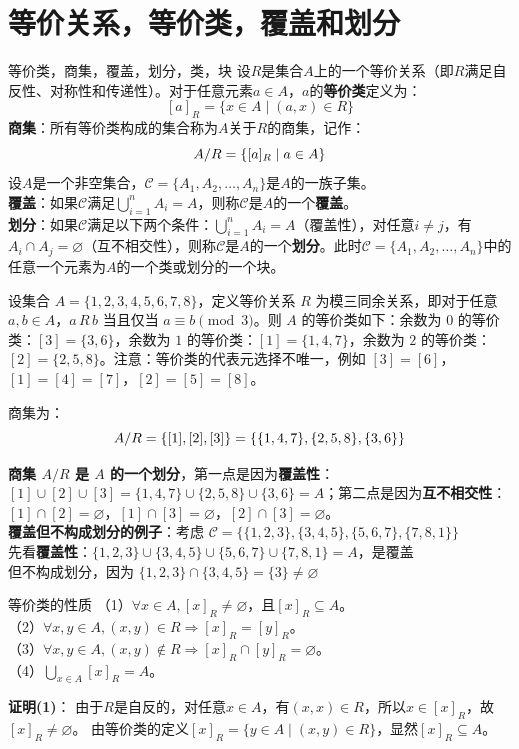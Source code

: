 \documentclass[lang=cn,11pt]{elegantbook}
\begin{document}
\section{等价关系，等价类，覆盖和划分}
\begin{definition}{等价类，商集，覆盖，划分，类，块}
设$R$是集合$A$上的一个等价关系（即$R$满足自反性、对称性和传递性）。对于任意元素$a \in A$，$a$的\textbf{等价类}定义为：\vspace{-10pt}
\[
[a]_R = \{x \in A \mid (a,x) \in R\}
\]
\textbf{商集}：所有等价类构成的集合称为$A$关于$R$的商集，记作：\vspace{-5pt}
\[
A/R = \{[a]_R \mid a \in A\}\vspace{-5pt}
\]
设$A$是一个非空集合，$\mathcal{C} = \{A_1, A_2, \ldots, A_n\}$是$A$的一族子集。\\
\textbf{覆盖}：如果$\mathcal{C}$满足$\bigcup_{i=1}^{n} A_i = A$，则称$\mathcal{C}$是$A$的一个\textbf{覆盖}。\\
\textbf{划分}：如果$\mathcal{C}$满足以下两个条件：$\bigcup_{i=1}^{n} A_i = A$（覆盖性），对任意$i \neq j$，有$A_i \cap A_j = \varnothing$（互不相交性），则称$\mathcal{C}$是$A$的一个\textbf{划分}。此时$\mathcal{C} = \{A_1, A_2, \ldots, A_n\}$中的任意一个元素为$A$的一个类或划分的一个块。
\end{definition}
设集合 $A = \{1, 2, 3, 4, 5, 6, 7, 8\}$，定义等价关系 $R$ 为模三同余关系，即对于任意 $a, b \in A$，$a \, R \, b$ 当且仅当 $a \equiv b \pmod{3}$。则 $A$ 的等价类如下：余数为 $0$ 的等价类：$[3] = \{3, 6\}$，余数为 $1$ 的等价类：$[1] = \{1, 4, 7\}$，余数为 $2$ 的等价类：$[2] = \{2, 5, 8\}$。注意：等价类的代表元选择不唯一，例如 $[3] = [6]$，$[1] = [4] = [7]$，$[2] = [5] = [8]$。

商集为：\vspace{-5pt}
\[
A/R = \{[1], [2], [3]\} = \{\{1,4,7\}, \{2,5,8\}, \{3,6\}\}\vspace{-5pt}
\]

\textbf{商集 $A/R$ 是 $A$ 的一个划分}，第一点是因为\textbf{覆盖性}：$[1] \cup [2] \cup [3] = \{1,4,7\} \cup \{2,5,8\} \cup \{3,6\} = A$；第二点是因为\textbf{互不相交性}：$[1] \cap [2] = \varnothing$，$[1] \cap [3] = \varnothing$，$[2] \cap [3] = \varnothing$。\\
\textbf{覆盖但不构成划分的例子}：考虑 $\mathcal{C} = \{\{1,2,3\}, \{3,4,5\}, \{5,6,7\}, \{7,8,1\}\}$\\先看\textbf{覆盖性}：$\{1,2,3\} \cup \{3,4,5\} \cup \{5,6,7\} \cup \{7,8,1\} = A$，是覆盖
\\但不构成划分，因为 $\{1,2,3\} \cap \{3,4,5\} = \{3\} \neq \varnothing$
\begin{theorem}{等价类的性质}
（1）$\forall x\in A,[x]_R\ne\varnothing$，且$[x]_R\subseteq A$。\\
（2）$\forall x,y\in A,(x,y)\in R\Rightarrow [x]_R=[y]_R$。\\
（3）$\forall x,y\in A,(x,y)\notin R\Rightarrow [x]_R\cap[y]_R=\varnothing$。\\
（4）$\bigcup_{x\in A} [x]_R = A$。
\end{theorem}
\textbf{证明(1)}：
由于$R$是自反的，对任意$x \in A$，有$(x,x) \in R$，所以$x \in [x]_R$，故$[x]_R \neq \varnothing$。
由等价类的定义$[x]_R = \{y \in A \mid (x,y) \in R\}$，显然$[x]_R \subseteq A$。
\end{document}
